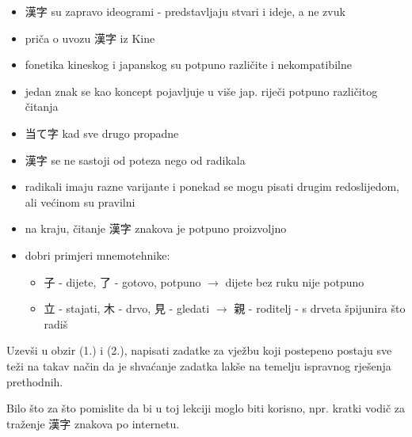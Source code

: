 	\begin{itemize}
		\itemsep-5pt
		\item 漢字 su zapravo ideogrami - predstavljaju stvari i ideje, a ne zvuk
		\item priča o uvozu 漢字 iz Kine
		\item fonetika kineskog i japanskog su potpuno različite i nekompatibilne
		\item jedan znak se kao koncept pojavljuje u više jap. riječi potpuno različitog čitanja
		\item 当て字 kad sve drugo propadne
		\item 漢字 se ne sastoji od poteza nego od radikala
		\item radikali imaju razne varijante i ponekad se mogu pisati drugim redoslijedom, ali većinom su pravilni
		\item na kraju, čitanje 漢字 znakova je potpuno proizvoljno
		\item dobri primjeri mnemotehnike:
		\begin{itemize}
			\itemsep-5pt
			\item 子 - dijete, 了 - gotovo, potpuno $\rightarrow$ dijete bez ruku nije potpuno
			\item 立 - stajati, 木 - drvo, 見 - gledati $\rightarrow$ 親 - roditelj - s drveta špijunira što radiš
		\end{itemize}
	\end{itemize}

	
	Uzevši u obzir (1.) i (2.), napisati zadatke za vježbu koji postepeno postaju sve teži na takav način da je shvaćanje zadatka lakše na temelju ispravnog rješenja prethodnih.
	
	
	Bilo što za što pomislite da bi u toj lekciji moglo biti korisno, npr. kratki vodič za traženje 漢字 znakova po internetu.
	
